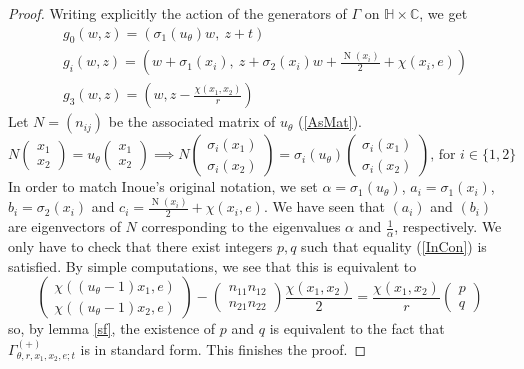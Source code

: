 \documentclass[12pt]{amsart}
\newcommand{\C}{\mathbb{C}}
\newcommand{\HH}{\mathbb{H}}
\DeclareMathOperator{\Norm}{N}
\begin{document}
\begin{proof}
Writing explicitly the action of the generators of $\Gamma$ on $\HH \times \C$, we get
\begin{align*}
&g_0(w,z)=(\sigma_1(u_\theta)w,\ z+t)\\
&g_i(w,z)=(w+\sigma_1(x_i),\ z+\sigma_2(x_i)w+\frac{\Norm(x_i)}{2} + \chi(x_i,e))\\
&g_3(w,z)=(w,z-\frac{\chi(x_1,x_2)}{r})
\end{align*}
Let $N=(n_{ij})$ be the associated matrix of $u_\theta$ (\ref{AsMat}). 
$$N \begin{pmatrix}x_1 \\x_2\end{pmatrix}=u_\theta\begin{pmatrix}x_1 \\x_2\end{pmatrix} \implies N\begin{pmatrix}\sigma_i(x_1) \\\sigma_i(x_2)\end{pmatrix} = \sigma_i(u_\theta)\begin{pmatrix}\sigma_i(x_1) \\\sigma_i(x_2)\end{pmatrix}\text{, for } i \in \{1,2\}$$
In order to match Inoue's original notation, we set $\alpha = \sigma_1(u_\theta)$, $a_i = \sigma_1(x_i)$, $b_i=\sigma_2(x_i)$ and $c_i=\frac{\Norm(x_i)}{2} + \chi(x_i,e)$. We have seen that $(a_i)$ and $(b_i)$ are eigenvectors of $N$ corresponding to the eigenvalues $\alpha$ and $\frac{1}{\alpha}$, respectively. We only have to check that there exist integers $p,q$ such that equality (\ref{InCon}) is satisfied. By simple computations, we see that this is equivalent to 
$$\begin{pmatrix} \chi((u_\theta -1)x_1,e) \\
\chi((u_\theta -1)x_2,e)\end{pmatrix} - \begin{pmatrix}n_{11}n_{12}\\
n_{21}n_{22}
\end{pmatrix} \frac{\chi(x_1,x_2)}{2} = \frac{\chi(x_1,x_2)}{r}\begin{pmatrix}p \\q \end{pmatrix}$$
so, by lemma \ref{sf},  the existence of $p$ and $q$ is equivalent to the fact that $\Gamma_{\theta,r,x_1,x_2,e;t}^{(+)}$ is in standard form. This finishes the proof.
\end{proof}
\end{document}
